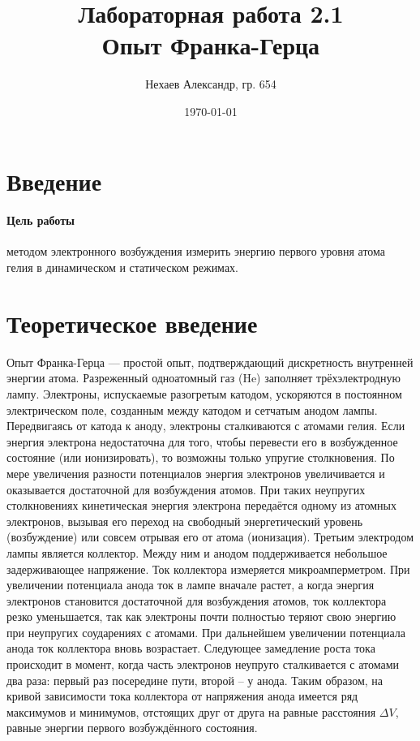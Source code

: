 \documentclass[a4paper, 12pt]{article}
\title{Лабораторная работа 2.1\\Опыт Франка-Герца}
\author{Нехаев Александр, гр. 654}
\date{\today}
\begin{document}
	\maketitle
	\newpage
	\tableofcontents
	\newpage
	\section{Введение}
	\paragraph{Цель работы} методом электронного возбуждения измерить энергию первого уровня атома гелия в динамическом и статическом режимах.
	\section{Теоретическое введение
		}
	Опыт Франка-Герца --- простой опыт, подтверждающий дискретность внутренней энергии атома. 
	Разреженный одноатомный газ (He) заполняет трёхэлектродную лампу. Электроны, испускаемые разогретым катодом, ускоряются в постоянном электрическом поле, созданным между катодом и сетчатым анодом лампы. Передвигаясь от катода к аноду, электроны сталкиваются с атомами гелия. Если энергия электрона недостаточна для того, чтобы перевести его в возбужденное состояние (или ионизировать), то возможны только упругие столкновения. По мере увеличения разности потенциалов энергия электронов увеличивается и оказывается достаточной для возбуждения атомов. При таких неупругих столкновениях кинетическая энергия электрона передаётся одному из атомных электронов, вызывая его переход на свободный энергетический уровень (возбуждение) или совсем отрывая его от атома (ионизация).
	Третьим электродом лампы является коллектор. Между ним и анодом поддерживается небольшое задерживающее напряжение. Ток коллектора измеряется микроамперметром.
	При увеличении потенциала анода ток в лампе вначале растет, а когда энергия электронов становится достаточной для возбуждения атомов, ток коллектора резко уменьшается, так как электроны почти полностью теряют свою энергию при неупругих соударениях с атомами. При дальнейшем увеличении потенциала анода ток коллектора вновь возрастает. Следующее замедление роста тока происходит в момент, когда часть электронов неупруго сталкивается с атомами два раза: первый раз посередине пути, второй -- у анода. Таким образом, на кривой зависимости тока коллектора от напряжения анода имеется ряд максимумов и минимумов, отстоящих друг от друга на равные расстояния $\Delta V$, равные энергии первого возбуждённого состояния.
	
\end{document}
